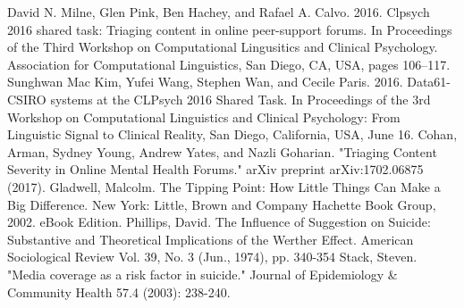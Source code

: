 \documentclass{article}
\begin{document}
\begin{thebibliography}{9}

	David N. Milne, Glen Pink, Ben Hachey, and Rafael A. Calvo. 2016. Clpsych 2016 shared task: Triaging content in online peer-support forums. In Proceedings of the Third Workshop on Computational Lingusitics and Clinical Psychology. Association for Computational Linguistics, San Diego, CA, USA, pages 106–117.
	Sunghwan Mac Kim, Yufei Wang, Stephen Wan, and Cecile Paris. 2016. Data61-CSIRO systems at the CLPsych 2016 Shared Task. In Proceedings of the 3rd Workshop on Computational Linguistics and Clinical Psychology: From Linguistic Signal to Clinical Reality, San Diego, California, USA, June 16.
        Cohan, Arman, Sydney Young, Andrew Yates, and Nazli Goharian. "Triaging Content Severity in Online Mental Health Forums." arXiv preprint arXiv:1702.06875 (2017).
        Gladwell, Malcolm. The Tipping Point: How Little Things Can Make a Big Difference. New York: Little, Brown and Company Hachette Book Group, 2002. eBook Edition.
        Phillips, David. The Influence of Suggestion on Suicide: Substantive and Theoretical Implications of the Werther Effect. American Sociological Review Vol. 39, No. 3 (Jun., 1974), pp. 340-354
        Stack, Steven. "Media coverage as a risk factor in suicide." Journal of Epidemiology \& Community Health 57.4 (2003): 238-240.

\end{thebibliography}
\end{document}
